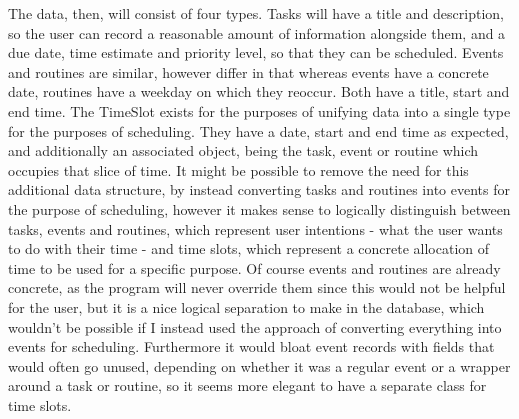 \documentclass{article}
\begin{document}
The data, then, will consist of four types.
Tasks will have a title and description,
so the user can record a reasonable amount of information alongside them,
and a due date, time estimate and priority level,
so that they can be scheduled.
Events and routines are similar,
however differ in that whereas events have a concrete date,
routines have a weekday on which they reoccur.
Both have a title, start and end time.
The TimeSlot exists for the purposes of unifying data into a single type for the purposes of scheduling.
They have a date, start and end time as expected,
and additionally an associated object,
being the task, event or routine which occupies that slice of time.
It might be possible to remove the need for this additional data structure,
by instead converting tasks and routines into events for the purpose of scheduling,
however it makes sense to logically distinguish between tasks, events and routines,
which represent user intentions -
what the user wants to do with their time -
and time slots,
which represent a concrete allocation of time to be used for a specific purpose.
Of course events and routines are already concrete,
as the program will never override them since this would not be helpful for the user,
but it is a nice logical separation to make in the database,
which wouldn't be possible if I instead used the approach of converting everything into events for scheduling.
Furthermore it would bloat event records with fields that would often go unused,
depending on whether it was a regular event or a wrapper around a task or routine,
so it seems more elegant to have a separate class for time slots.
\end{document}
